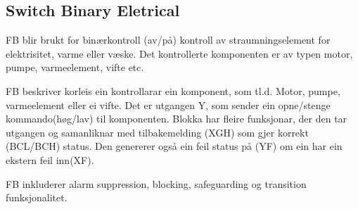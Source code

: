 \newpage

\subsection{Switch Binary Eletrical}

\gls{FB} blir brukt for binærkontroll (av/på) kontroll av straumningselement for elektrisitet, varme eller væske. Det
kontrollerte komponenten er av typen motor, pumpe, varmeelement, vifte etc.

\gls{FB} beskriver korleis ein kontrollarar ein komponent, som tl.d. Motor, pumpe, varmeelement eller ei vifte.
Det er utgangen Y, som sender ein opne/stenge kommando(høg/lav) til komponenten. Blokka har fleire funksjonar, der den
tar utgangen og samanliknar med tilbakemelding (XGH) som gjer korrekt (BCL/BCH) status. Den genererer også ein feil status på
(YF) om ein har ein ekstern feil inn(XF).

\gls{FB} inkluderer alarm suppression, blocking, safeguarding og transition funksjonalitet.

